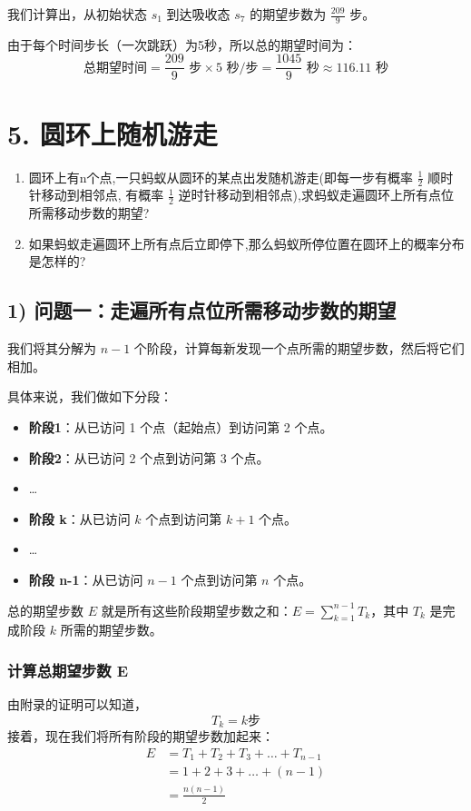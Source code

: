 \documentclass[UTF8]{ctexart}
\begin{document}
我们计算出，从初始状态 $s_1$ 到达吸收态 $s_7$ 的期望步数为 $\frac{209}{9}$ 步。

由于每个时间步长（一次跳跃）为5秒，所以总的期望时间为：
\[
\text{总期望时间} = \frac{209}{9} \text{ 步} \times 5 \text{ 秒/步} = \frac{1045}{9} \text{ 秒} \approx 116.11 \text{ 秒}
\]


\section*{5. 圆环上随机游走}

\begin{enumerate}
    \item 圆环上有n个点,一只蚂蚁从圆环的某点出发随机游走(即每一步有概率 $\frac{1}{2}$ 顺时针移动到相邻点, 有概率 $\frac{1}{2}$ 逆时针移动到相邻点),求蚂蚁走遍圆环上所有点位所需移动步数的期望?
    \item 如果蚂蚁走遍圆环上所有点后立即停下,那么蚂蚁所停位置在圆环上的概率分布是怎样的?
\end{enumerate}
\subsection*{1) 问题一：走遍所有点位所需移动步数的期望}

我们将其分解为 $n-1$ 个阶段，计算每新发现一个点所需的期望步数，然后将它们相加。

具体来说，我们做如下分段：
\begin{itemize}
    \item \textbf{阶段1}：从已访问 1 个点（起始点）到访问第 2 个点。
    \item \textbf{阶段2}：从已访问 2 个点到访问第 3 个点。
    \item \dots
    \item \textbf{阶段 k}：从已访问 $k$ 个点到访问第 $k+1$ 个点。
    \item \dots
    \item \textbf{阶段 n-1}：从已访问 $n-1$ 个点到访问第 $n$ 个点。
\end{itemize}
总的期望步数 $E$ 就是所有这些阶段期望步数之和：$E = \sum_{k=1}^{n-1} T_k$，其中 $T_k$ 是完成阶段 $k$ 所需的期望步数。


\subsubsection*{计算总期望步数 E}
由附录的证明可以知道，\[ T_k = k \text{步} \]
接着，现在我们将所有阶段的期望步数加起来：
\begin{align*}
E &= T_1 + T_2 + T_3 + \dots + T_{n-1} \\
  &= 1 + 2 + 3 + \dots + (n-1)\\
  &=\frac{n(n-1)}{2}
\end{align*}
\end{document}
